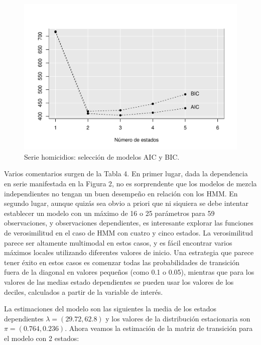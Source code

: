 \documentclass[a4paper]{article}\usepackage[]{graphicx}\usepackage[]{color}
\makeatletter
\def\maxwidth{ %
  \ifdim\Gin@nat@width>\linewidth
    \linewidth
  \else
    \Gin@nat@width
  \fi
}
\newenvironment{knitrout}{}{} %
\makeatother
\begin{document}
\begin{knitrout}
\color{fgcolor}\begin{figure}[h]
\includegraphics[width=\maxwidth]{figure/unnamed-chunk-12-1} \caption[Serie homicidios]{Serie homicidios: selección de modelos AIC y BIC.}\label{fig:unnamed-chunk-12}
\end{figure}


\end{knitrout}

Varios comentarios surgen de la Tabla 4. En primer lugar, dada la dependencia en serie manifestada en la Figura 2, no es sorprendente que los modelos de mezcla independientes no tengan un buen desempeño en relación con los HMM. En segundo lugar, aunque quizás sea obvio a priori que ni siquiera se debe intentar establecer un modelo con un máximo de 16 o 25 parámetros para 59 observaciones, y observaciones dependientes, es interesante explorar las funciones de verosimilitud en el caso de HMM con cuatro y cinco estados. La verosimilitud parece ser altamente multimodal en estos casos, y es fácil encontrar varios máximos locales utilizando diferentes valores de inicio. Una estrategia que parece tener éxito en estos casos es comenzar todas las probabilidades de transición fuera de la diagonal en valores pequeños (como 0.1 o 0.05), mientras que para los valores de las medias estado dependientes se pueden usar los valores de los deciles, calculados a partir de la variable de interés.



La estimaciones del modelo son las siguientes la media de los estados dependientes $\lambda = (29.72, 62.8)$  y los valores de la distribución estacionaria son $\pi = (0.764, 0.236)$. Ahora veamos la estimación de la matriz de transición para el modelo con 2 estados:
\end{document}
